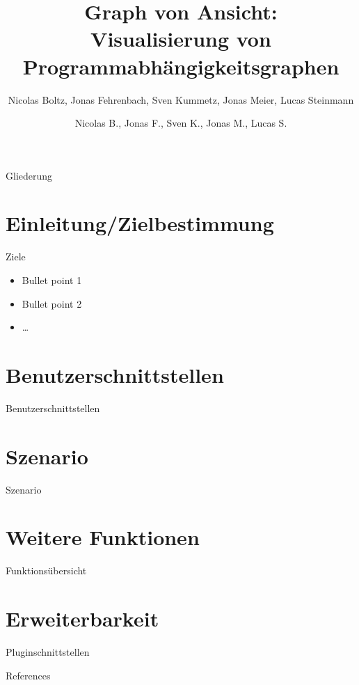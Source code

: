 \documentclass[18pt]{beamer}
\title[Graph von Ansicht]{Graph von Ansicht:\\ Visualisierung von Programmabhängigkeitsgraphen}
\subtitle{}
\author{Nicolas Boltz, Jonas Fehrenbach, Sven Kummetz, Jonas Meier, Lucas Steinmann}
\institute{}
\begin{document}

\begin{frame}
\titlepage
\end{frame}

\author{Nicolas B., Jonas F., Sven K., Jonas M., Lucas S.}
\begin{frame}{Gliederung}
\tableofcontents
\end{frame}

\section{Einleitung/Zielbestimmung}
\begin{frame}{Ziele}
\begin{itemize}
\item Bullet point 1
\pause
\item Bullet point 2
\item \dots
\end{itemize}
\end{frame}

\section{Benutzerschnittstellen}
\begin{frame}{Benutzerschnittstellen}
\end{frame}

\section{Szenario}
\begin{frame}{Szenario}
\end{frame}

\section{Weitere Funktionen}
\begin{frame}{Funktionsübersicht}
\end{frame}

\section{Erweiterbarkeit}
\begin{frame}{Pluginschnittstellen}
\end{frame}
\appendix
\beginbackup

\begin{frame}[allowframebreaks]{References}

\end{frame}

\backupend
\end{document}
